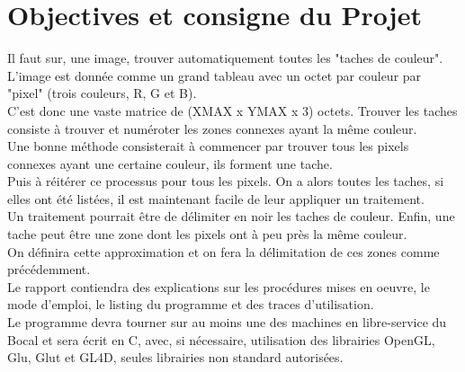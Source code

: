 \documentclass[12pt, letterpaper]{article}
\begin{document}
\section{Objectives et consigne du Projet}
Il faut sur, une image, trouver automatiquement toutes les "taches de couleur".\\
L'image est donnée comme un grand tableau avec un octet par couleur par "pixel" (trois couleurs, R, G et B).\\
C'est donc une vaste matrice de (XMAX x YMAX x 3) octets. Trouver les taches consiste à trouver et numéroter les zones connexes ayant la même couleur.\\
Une bonne méthode consisterait à commencer par trouver tous les pixels connexes ayant une certaine couleur, ils forment une tache.\\
Puis à réitérer ce processus pour tous les pixels. On a alors toutes les taches, si elles ont été listées, il est maintenant facile de leur appliquer un traitement.\\
Un traitement pourrait être de délimiter en noir les taches de couleur. Enfin, une tache peut être une zone dont les pixels ont à peu près la même couleur.\\
On définira cette approximation et on fera la délimitation de ces zones comme précédemment. \\
Le rapport contiendra des explications sur les procédures mises en oeuvre, le mode d'emploi, le listing du programme et des traces d'utilisation.\\
Le programme devra tourner sur au moins une des machines en libre-service du Bocal et sera écrit en C, avec, si nécessaire, 
utilisation des librairies OpenGL, Glu, Glut et GL4D, seules librairies non standard autorisées.
\end{document}
